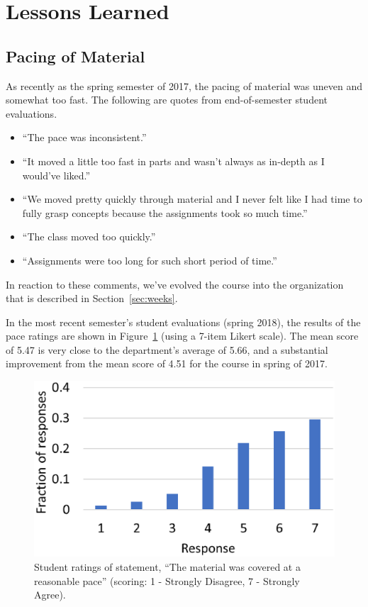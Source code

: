 \section{Lessons Learned}
\label{sec:lessons}


\subsection{Pacing of Material}


As recently as the spring semester of 2017, the pacing of material
was uneven and somewhat too fast.  The following are quotes from
end-of-semester student evaluations.
\begin{itemize}
\item ``The pace was inconsistent.''
\item ``It moved a little too fast in parts and wasn't always as
in-depth as I would've liked.''
\item ``We moved pretty quickly through material and I never felt like I had
time to fully grasp concepts because the assignments took so much time.''
\item ``The class moved too quickly.''
\item ``Assignments were too long for such short period of time.''
\end{itemize}
In reaction to these comments, we've evolved the course into the organization
that is described in Section~\ref{sec:weeks}.

In the most recent semester's student evaluations (spring 2018),
the results of the pace ratings are shown in Figure~\ref{fig:pace}
(using a 7-item Likert scale).
The mean score of 5.47 is very close to the department's average of
5.66, and a substantial improvement from the mean score of 4.51
for the course in spring of 2017.

\begin{figure}[ht]
\centering
\includegraphics[width=\columnwidth]{pace}
\caption{Student ratings of statement, ``The material was covered
at a reasonable pace''  (scoring: 1 - Strongly Disagree, 7 - Strongly Agree).}
\label{fig:pace}
\end{figure}

